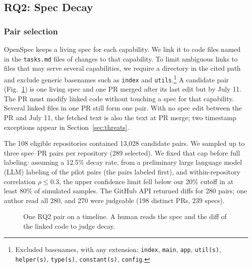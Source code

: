 \documentclass[10pt,conference]{IEEEtran}
\begin{document}
\subsection{RQ2: Spec Decay}
\subsubsection{Pair selection}
OpenSpec keeps a living spec for each capability. We link it to code files named in the \texttt{tasks.md} files of changes to that capability. To limit ambiguous links to files that may serve several capabilities, we require a directory in the cited path and exclude generic basenames such as \texttt{index} and \texttt{utils}.\footnote{Excluded basenames, with any extension: \texttt{index}, \texttt{main}, \texttt{app}, \texttt{util(s)}, \texttt{helper(s)}, \texttt{type(s)}, \texttt{constant(s)}, \texttt{config}.} A candidate pair (Fig.~\ref{fig:pair}) is one living spec and one PR merged after its last edit but by July 11. The PR must modify linked code without touching a spec for that capability. Several linked files in one PR still form one pair. With no spec edit between the PR and July 11, the fetched text is also the text at PR merge; two timestamp exceptions appear in Section~\ref{sec:threats}.

The 108 eligible repositories contained 13,028 candidate pairs. We sampled up to three spec--PR pairs per repository (289 selected). We fixed that cap before full labeling: assuming a 12.5\% decay rate, from a preliminary large language model (LLM) labeling of the pilot pairs (the pairs labeled first), and within-repository correlation $\rho \le 0.3$, the upper confidence limit fell below our 20\% cutoff in at least 80\% of simulated samples. The GitHub API returned diffs for 280 pairs; one author read all 280, and 270 were judgeable (198 distinct PRs, 239 specs).

\begin{figure}[t]
\centering
{}
\caption{One RQ2 pair on a timeline. A human reads the spec and the diff of the linked code to judge decay.}
\label{fig:pair}
\end{figure}
\end{document}
